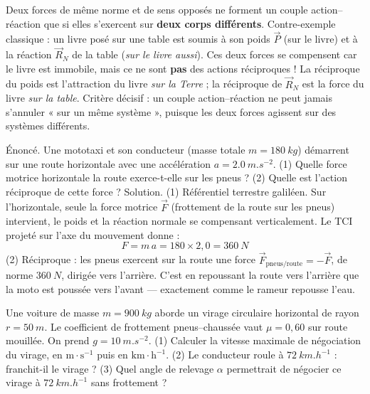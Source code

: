 \documentclass[11pt]{article}
\begin{document}
\begin{attention}
Deux forces de même norme et de sens opposés ne forment un couple action--réaction que si elles s'exercent sur \textbf{deux corps différents}. Contre-exemple classique : un livre posé sur une table est soumis à son poids $\vec{P}$ (sur le livre) et à la réaction $\vec{R}_N$ de la table (\emph{sur le livre aussi}). Ces deux forces se compensent car le livre est immobile, mais ce ne sont \textbf{pas} des actions réciproques ! La réciproque du poids est l'attraction du livre \emph{sur la Terre} ; la réciproque de $\vec{R}_N$ est la force du livre \emph{sur la table}. Critère décisif : un couple action--réaction ne peut jamais s'annuler « sur un même système », puisque les deux forces agissent sur des systèmes différents.
\end{attention}

\begin{exoresolu}
Énoncé. Une mototaxi et son conducteur (masse totale $m = \SI{180}{kg}$) démarrent sur une route horizontale avec une accélération $a = \SI{2,0}{m.s^{-2}}$. (1) Quelle force motrice horizontale la route exerce-t-elle sur les pneus ? (2) Quelle est l'action réciproque de cette force ?
\tcblower
Solution. (1) Référentiel terrestre galiléen. Sur l'horizontale, seule la force motrice $\vec{F}$ (frottement de la route sur les pneus) intervient, le poids et la réaction normale se compensant verticalement. Le TCI projeté sur l'axe du mouvement donne :
\[ F = m\,a = 180\times 2{,}0 = \SI{360}{N} \]
(2) Réciproque : les pneus exercent sur la route une force $\vec{F}_{\text{pneus/route}} = -\vec{F}$, de norme $\SI{360}{N}$, dirigée vers l'arrière. C'est en repoussant la route vers l'arrière que la moto est poussée vers l'avant — exactement comme le rameur repousse l'eau.
\end{exoresolu}

\begin{exercice}
Une voiture de masse $m = \SI{900}{kg}$ aborde un virage circulaire horizontal de rayon $r = \SI{50}{m}$. Le coefficient de frottement pneus--chaussée vaut $\mu = 0{,}60$ sur route mouillée. On prend $g = \SI{10}{m.s^{-2}}$. (1) Calculer la vitesse maximale de négociation du virage, en $\mathrm{m\cdot s^{-1}}$ puis en $\mathrm{km\cdot h^{-1}}$. (2) Le conducteur roule à $\SI{72}{km.h^{-1}}$ : franchit-il le virage ? (3) Quel angle de relevage $\alpha$ permettrait de négocier ce virage à $\SI{72}{km.h^{-1}}$ sans frottement ?
\end{exercice}
\end{document}
